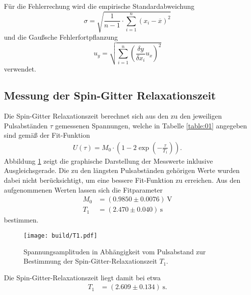 \noindent Für die Fehlerrechung wird die empirische Standardabweichung
\begin{equation}
  \sigma = \sqrt{\frac{1}{n-1} \cdot \sum_{i=1}^n(x_i-\overline{x})^2}
  \label{eqn:Stdabweichung}
\end{equation}
und die Gaußsche Fehlerfortpflanzung
\begin{equation}
  u_y = \sqrt{\sum_{i=1}^n\left(\frac{\delta y}{\delta x_i}u_x\right)^2}
  \label{eqn:gauß}
\end{equation}
verwendet.
\subsection{Messung der Spin-Gitter Relaxationszeit}
\noindent Die Spin-Gitter Relaxationszeit berechnet sich aus den zu den
jeweiligen Pulsabständen $\tau$ gemessenen Spannungen, welche in Tabelle
\ref{table:01} angegeben sind gemäß der Fit-Funktion
\begin{align}
  U(\tau) = M_0 \cdot \left(1 - 2\exp{\left(- \frac{\tau}{T_1}\right)}\right).
  \label{eqn:03}
\end{align}
\noindent Abbildung \ref{fig:01} zeigt die graphische Darstellung der Messwerte
inklusive Ausgleichsgerade. Die zu den längsten Pulsabständen gehörigen Werte
wurden dabei nicht berücksichtigt, um eine bessere Fit-Funktion zu erreichen.
Aus den aufgenommenen Werten lassen sich die Fitparameter
\begin{align*}
  M_0 &=  (0.9850  \pm  0.0076) \: \si{\volt} \\
  T_1 &=  (2.470  \pm  0.040) \: \si{\second}
\end{align*}
\noindent bestimmen.
\FloatBarrier

\FloatBarrier
\FloatBarrier
\begin{figure}
  \texttt{[image: build/T1.pdf]}
  \caption{Spannungsamplituden in Abhängigkeit vom Pulsabstand zur Bestimmung
           der Spin-Gitter-Relaxationszeit $T_1$.}
  \label{fig:01}
\end{figure}
\FloatBarrier
\noindent Die Spin-Gitter-Relaxationszeit liegt damit bei etwa
\begin{align*}
  T_1 &=  (2.609  \pm  0.134) \: \si{\second}.
\end{align*}
